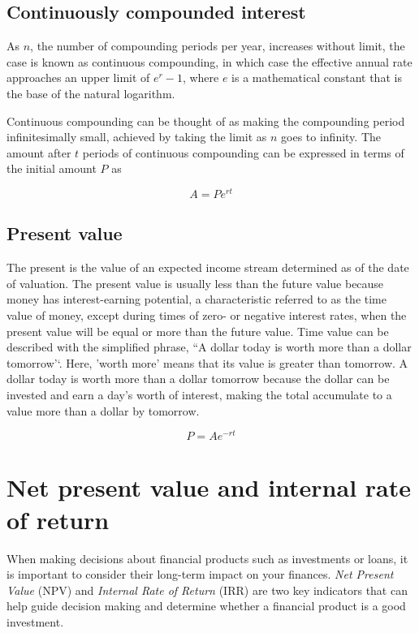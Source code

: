 \subsection{Continuously compounded interest}\label{continuously-compounded-interest}

As \(n\), the number of compounding periods per year, increases without limit, the case is known as continuous compounding, in which case the effective annual rate approaches an upper limit of \(e^r- 1\), where \(e\) is a mathematical constant that is the base of the natural logarithm.

Continuous compounding can be thought of as making the compounding period infinitesimally small, achieved by taking the limit as \(n\) goes to infinity. The amount after \(t\) periods of continuous compounding can be expressed in terms of the initial amount \(P\) as

\[
A=Pe^{rt}
\]

\subsection{Present value}\label{present-value}

The present is the value of an expected income stream determined as of the date of valuation. The present value is usually less than the future value because money has interest-earning potential, a characteristic referred to as the time value of money, except during times of zero- or negative interest rates, when the present value will be equal or more than the future value. Time value can be described with the simplified phrase, ``A dollar today is worth more than a dollar tomorrow'`. Here, 'worth more' means that its value is greater than tomorrow. A dollar today is worth more than a dollar tomorrow because the dollar can be invested and earn a day's worth of interest, making the total accumulate to a value more than a dollar by tomorrow.

\[
P=Ae^{-rt}
\]

\section{Net present value and internal rate of return}\label{net-present-value-and-internal-rate-of-return}

When making decisions about financial products such as investments or loans, it is important to consider their long-term impact on your finances. \emph{Net Present Value} (NPV) and \emph{Internal Rate of Return} (IRR) are two key indicators that can help guide decision making and determine whether a financial product is a good investment.


